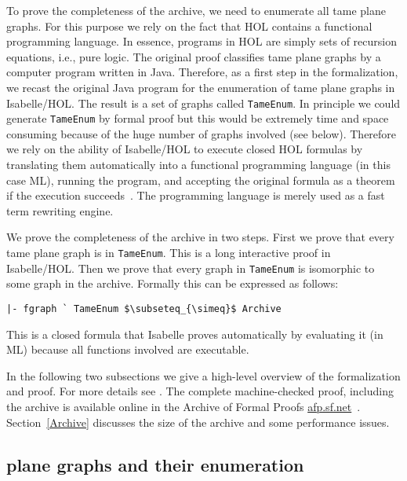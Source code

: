 To prove the completeness of the archive, we need to enumerate all
tame plane graphs. For this purpose we rely on the fact that HOL
contains a functional programming language. In essence, programs in
HOL are simply sets of recursion equations, i.e., pure logic.  The
original proof classifies tame plane graphs by a computer program
written in Java.  Therefore, as a first step in the formalization, we
recast the original Java program for the enumeration of tame plane graphs in
Isabelle/HOL. The result is a set of graphs called \verb!TameEnum!.  In
principle we could generate \verb!TameEnum! by formal proof but this
would be extremely time and space consuming because of the huge number
of graphs involved (see below). Therefore we rely on the ability of
Isabelle/HOL to execute closed HOL formulas by translating them
automatically into a functional programming language (in this case
ML), running the program, and accepting the original formula as a
theorem if the execution succeeds~\cite{DBLP:conf/flops/HaftmannN10}. The
programming language is merely used as a fast term rewriting engine.

We prove the completeness of the archive in two steps. First
we prove that every tame plane graph is in \verb!TameEnum!.
This is a long interactive proof in Isabelle/HOL.
Then we prove that every graph in \verb!TameEnum! is isomorphic to some
graph in the archive. Formally this can be expressed as follows:

\begin{lstlisting}[keepspaces=true,stringstyle=\tt,basicstyle=\small,%
frame=none,framesep=8pt,mathescape,morekeywords={and,shows},columns=flexible]
|- fgraph ` TameEnum $\subseteq_{\simeq}$ Archive
\end{lstlisting}
This is a closed formula that Isabelle proves automatically by evaluating it
(in ML) because all functions involved are executable.

In the following two subsections we give a high-level overview of the
formalization and proof. For more details see
\cite{NipkowBS-IJCAR06,Nipkow-ITP11}. The complete machine-checked
proof, including the archive is available online in the Archive of
Formal Proofs
\url{afp.sf.net}~\cite{BauerN-AFP06}. Section~\ref{Archive} discusses
the size of the archive and some performance issues.

\subsection{plane graphs and their enumeration}\label{sec:tg}

